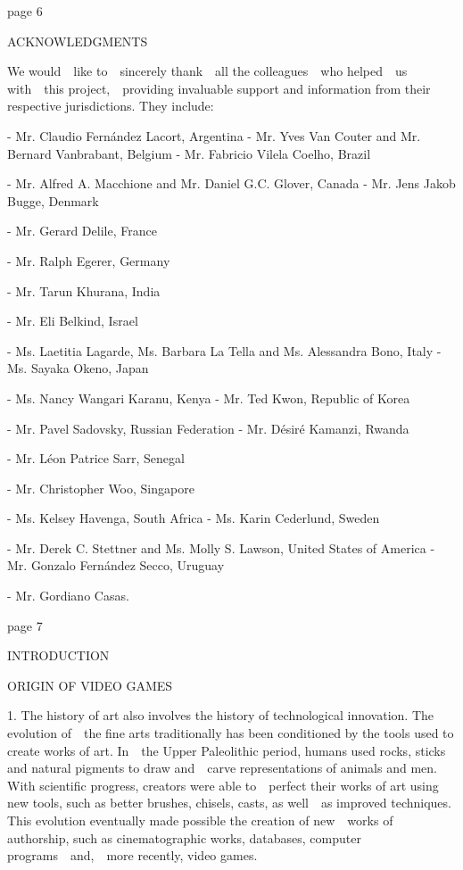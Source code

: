 \documentclass[
]{article}
\begin{document}
{page 6}

{ACKNOWLEDGMENTS}

{We would~~like to~~sincerely thank~~all the colleagues~~who helped~~us
with~~this project,~~providing invaluable support and information from
their respective jurisdictions. They include:}

{- }{Mr. Claudio Fernández Lacort, Argentina }{- }{Mr. Yves Van Couter
and Mr. Bernard Vanbrabant, Belgium }{- }{Mr. Fabricio Vilela Coelho,
Brazil}

{- }{Mr. Alfred A. Macchione and Mr. Daniel G.C. Glover, Canada }{-
}{Mr. Jens Jakob Bugge, Denmark}

{- }{Mr. Gerard Delile, France}

{- }{Mr. Ralph Egerer, Germany}

{- }{Mr. Tarun Khurana, India}

{- }{Mr. Eli Belkind, Israel}

{- }{Ms. Laetitia Lagarde, Ms. Barbara La Tella and Ms. Alessandra Bono,
Italy }{- }{Ms. Sayaka Okeno, Japan}

{- }{Ms. Nancy Wangari Karanu, Kenya }{- }{Mr. Ted Kwon, Republic of
Korea}

{- }{Mr. Pavel Sadovsky, Russian Federation }{- }{Mr. Désiré Kamanzi,
Rwanda}

{- }{Mr. Léon Patrice Sarr, Senegal}

{- }{Mr. Christopher Woo, Singapore}

{- }{Ms. Kelsey Havenga, South Africa }{- }{Ms. Karin Cederlund, Sweden}

{- }{Mr. Derek C. Stettner and Ms. Molly S. Lawson, United States of
America }{- }{Mr. Gonzalo Fernández Secco, Uruguay}

{- }{Mr. Gordiano Casas.}

{page 7}

{INTRODUCTION}

{ORIGIN OF VIDEO GAMES}

{1. }{The history of art also involves the history of technological
innovation. The evolution of~~the fine arts traditionally has been
conditioned by the tools used to create works of art. In~~the Upper
Paleolithic period, humans used rocks, sticks and natural pigments to
draw and~~carve representations of animals and men. With scientific
progress, creators were able to~~perfect their works of art using new
tools, such as better brushes, chisels, casts, as well~~as improved
techniques. This evolution eventually made possible the creation of
new~~works of authorship, such as cinematographic works, databases,
computer programs~~and,~~more recently, video games.}
\end{document}
